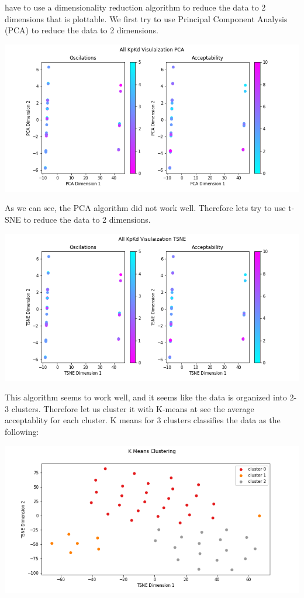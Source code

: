 \documentclass[12pt]{article}
\begin{document}
\begin{multicols}{2}
have to use a dimensionality reduction algorithm to reduce the data to 2 dimensions that is plottable. We first try to use
Principal Component Analysis (PCA) to reduce the data to 2 dimensions.
\begin{center}
    \includegraphics*[scale=0.3]{KpKiAllPCA.png}
\end{center}
As we can see, the PCA algorithm did not work well. Therefore lets try to use t-SNE to reduce the data to 2 dimensions.
\begin{center}
    \includegraphics*[scale=0.3]{KpKiAllTSNE.png}
\end{center}
This algorithm seems to work well, and it seems like the data is organized into 2-3 clusters. Therefore let us cluster 
it with K-means at see the average acceptablity for each cluster. K means for 3 clusters classifies the data as the following:
\begin{center}
    \includegraphics*[scale=0.3]{KpKiAllTSNEKMeans.png}

\end{center}
\end{multicols}
\end{document}
